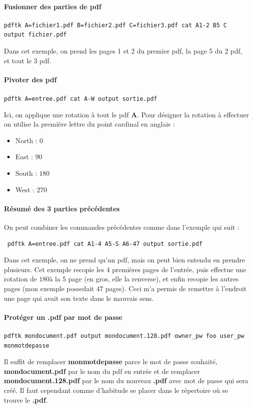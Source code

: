 \documentclass[a4paper,twoside]{article}
\begin{document}
\paragraph{Fusionner des parties de pdf}
\begin{verbatim}
pdftk A=fichier1.pdf B=fichier2.pdf C=fichier3.pdf cat A1-2 B5 C output fichier.pdf
\end{verbatim}

Dans cet exemple, on prend les pages 1 et 2 du premier pdf, la page 5 du 2\ieme{} pdf, et tout le 3\ieme{} pdf.

\paragraph{Pivoter des pdf}
\verb|pdftk A=entree.pdf cat A-W output sortie.pdf|

Ici, on applique une rotation à tout le pdf \textbf{A}. Pour désigner la rotation à effectuer on utilise la première lettre du point cardinal en anglais :

\begin{itemize}
 \item North : $0$\degre
\item East : $90$\degre
\item South : $180$\degre
\item West : $270$\degre
\end{itemize}

\paragraph{Résumé des 3 parties précédentes}
On peut combiner les commandes précédentes comme dans l'exemple qui suit :
\begin{verbatim}
 pdftk A=entree.pdf cat A1-4 A5-S A6-47 output sortie.pdf
\end{verbatim}

Dans cet exemple, on ne prend qu'un pdf, mais on peut bien entendu en prendre plusieurs. Cet exemple recopie les 4 premières pages de l'entrée, puis effectue une rotation de $180$\degre à la 5\ieme{} page (en gros, elle la renverse), et enfin recopie les autres pages (mon exemple possedait 47 pages). Ceci m'a permis de remettre à l'endroit une page qui avait son texte dans le mauvais sens.\par

\paragraph{Protéger un .pdf par mot de passe}
\begin{verbatim}
pdftk mondocument.pdf output mondocument.128.pdf owner_pw foo user_pw monmotdepasse
\end{verbatim}
Il suffit de remplacer \textbf{monmotdepasse} parce le mot de passe souhaité, \textbf{mondocument.pdf} par le nom du pdf en entrée et de remplacer \textbf{mondocument.128.pdf} par le nom du nouveau \textbf{.pdf} avec mot de passe qui sera créé. Il faut cependant comme d'habitude se placer dans le répertoire où se trouve le \textbf{.pdf}.
\end{document}
